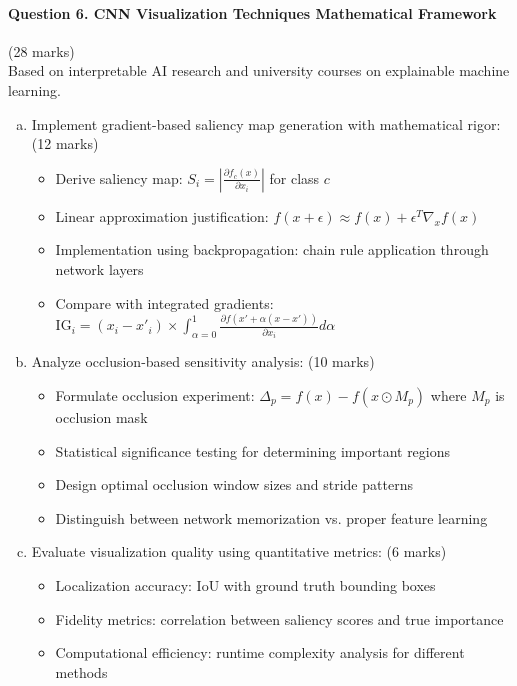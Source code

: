 \documentclass[12pt]{article}
\newcommand{\shortanswer}{\vspace{2cm}}
\newcommand{\mediumanswer}{\vspace{3cm}}
\newcommand{\journalspace}{\vspace{4.5cm}}
\begin{document}
\newpage
\paragraph{Question 6. CNN Visualization Techniques Mathematical Framework}{{\hfill (28 marks)}}\\
Based on interpretable AI research and university courses on explainable machine learning.

\begin{enumerate}[(a)]
    \item Implement gradient-based saliency map generation with mathematical rigor: \hfill (12 marks)
    \begin{itemize}
        \item Derive saliency map: $S_i = \left|\frac{\partial f_c(x)}{\partial x_i}\right|$ for class $c$
        \item Linear approximation justification: $f(x + \epsilon) \approx f(x) + \epsilon^T \nabla_x f(x)$
        \item Implementation using backpropagation: chain rule application through network layers
        \item Compare with integrated gradients: $\text{IG}_i = (x_i - x'_i) \times \int_{\alpha=0}^1 \frac{\partial f(x' + \alpha(x-x'))}{\partial x_i} d\alpha$
    \end{itemize}
    
    \journalspace
    
    \item Analyze occlusion-based sensitivity analysis: \hfill (10 marks)
    \begin{itemize}
        \item Formulate occlusion experiment: $\Delta_p = f(x) - f(x \odot M_p)$ where $M_p$ is occlusion mask
        \item Statistical significance testing for determining important regions
        \item Design optimal occlusion window sizes and stride patterns
        \item Distinguish between network memorization vs. proper feature learning
    \end{itemize}
    
    \mediumanswer
    
    \item Evaluate visualization quality using quantitative metrics: \hfill (6 marks)
    \begin{itemize}
        \item Localization accuracy: IoU with ground truth bounding boxes
        \item Fidelity metrics: correlation between saliency scores and true importance
        \item Computational efficiency: runtime complexity analysis for different methods
    \end{itemize}
    
    \shortanswer
\end{enumerate}
\end{document}
